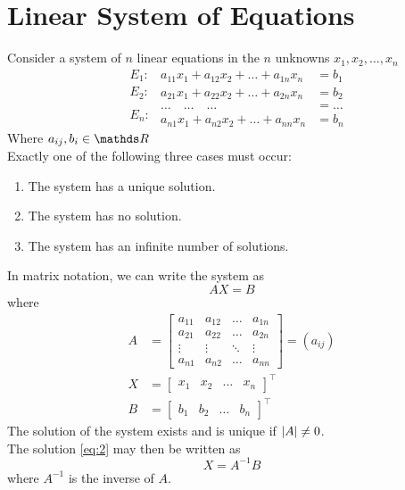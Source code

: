 \documentclass[12pt,class=book,crop=false]{standalone}
\begin{document}
\section{Linear System of Equations}
Consider a system of $ n $ linear equations in the $ n $ unknowns $ x_1,x_2,\dots,x_n $
\begin{equation}
    \label{eq:1}
    \left.\begin{aligned}
         & E_1: \\
         & E_2: \\
         &      \\
         & E_n: \\
    \end{aligned}\right.
    \left.\begin{aligned}
        a_{11} x_1+a_{12} x_2+\dots+a_{1n} x_n & =b_1   \\
        a_{21} x_1+a_{22} x_2+\dots+a_{2n}x_n  & =b_2   \\
        \dots\quad\dots\quad\dots              & =\dots \\
        a_{n1} x_1+a_{n2} x_2+\dots+a_{nn} x_n & =b_n
    \end{aligned}
    \right.
\end{equation}
Where $ a_{ij},b_i\in \R $\\
Exactly one of the following three cases must occur:
\begin{enumerate}[label={(\alph*)}]
    \item The system has a unique solution.
    \item The system has no solution.
    \item The system has an infinite number of solutions.
\end{enumerate}
In matrix notation, we can write the system as
\begin{equation}
    \label{eq:2}
    AX=B
\end{equation}
where
\begin{align*}
    A & =\begin{bmatrix}
        a_{11} & a_{12} & \dots  & a_{1n} \\
        a_{21} & a_{22} & \dots  & a_{2n} \\
        \vdots & \vdots & \ddots & \vdots \\
        a_{n1} & a_{n2} & \dots  & a_{nn}
    \end{bmatrix}=(a_{ij}) \\
    X & =\begin{bmatrix}
        x_1 & x_2 & \dots & x_n
    \end{bmatrix}^\top     \\
    B & =\begin{bmatrix}
        b_1 & b_2 & \dots & b_n
    \end{bmatrix}^\top
\end{align*}
The solution of the system exists and is unique if $\left\vert A\right\vert\neq0 $.\\
The solution \eqref{eq:2} may then be written as
\[
    X=A^{-1} B
\]
where $ A^{-1} $ is the inverse of $ A $.
\end{document}
